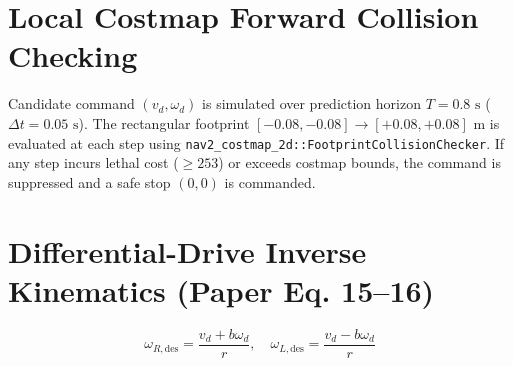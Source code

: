 \documentclass[11pt,a4paper]{article}
\begin{document}
\section{Local Costmap Forward Collision Checking}

Candidate command $(v_d, \omega_d)$ is simulated over prediction horizon $T = 0.8\text{ s}$ ($\Delta t = 0.05\text{ s}$). The rectangular footprint $[-0.08, -0.08] \to [+0.08, +0.08]\text{ m}$ is evaluated at each step using \texttt{nav2\_costmap\_2d::FootprintCollisionChecker}. If any step incurs lethal cost ($\ge 253$) or exceeds costmap bounds, the command is suppressed and a safe stop $(0, 0)$ is commanded.

\section{Differential-Drive Inverse Kinematics (Paper Eq. 15--16)}

\begin{equation}
    \omega_{R,\text{des}} = \frac{v_d + b \omega_d}{r}, \quad \omega_{L,\text{des}} = \frac{v_d - b \omega_d}{r}
\end{equation}
\end{document}
